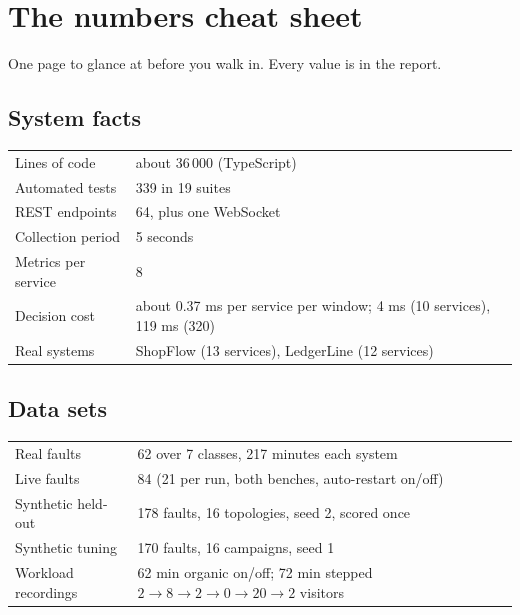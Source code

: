 \chapter{The numbers cheat sheet}
\label{ch:numbers}

One page to glance at before you walk in. Every value is in the report.

\section{System facts}
\begin{center}
\small
\begin{tabular}{@{}ll@{}}
\toprule
Lines of code & about 36\,000 (TypeScript)\\
Automated tests & 339 in 19 suites\\
REST endpoints & 64, plus one WebSocket\\
Collection period & 5 seconds\\
Metrics per service & 8\\
Decision cost & about 0.37 ms per service per window; 4 ms (10 services), 119 ms (320)\\
Real systems & ShopFlow (13 services), LedgerLine (12 services)\\
\bottomrule
\end{tabular}
\end{center}

\section{Data sets}
\begin{center}
\small
\begin{tabular}{@{}ll@{}}
\toprule
Real faults & 62 over 7 classes, 217 minutes each system\\
Live faults & 84 (21 per run, both benches, auto-restart on/off)\\
Synthetic held-out & 178 faults, 16 topologies, seed 2, scored once\\
Synthetic tuning & 170 faults, 16 campaigns, seed 1\\
Workload recordings & 62 min organic on/off; 72 min stepped $2\to8\to2\to0\to20\to2$ visitors\\
\bottomrule
\end{tabular}
\end{center}

